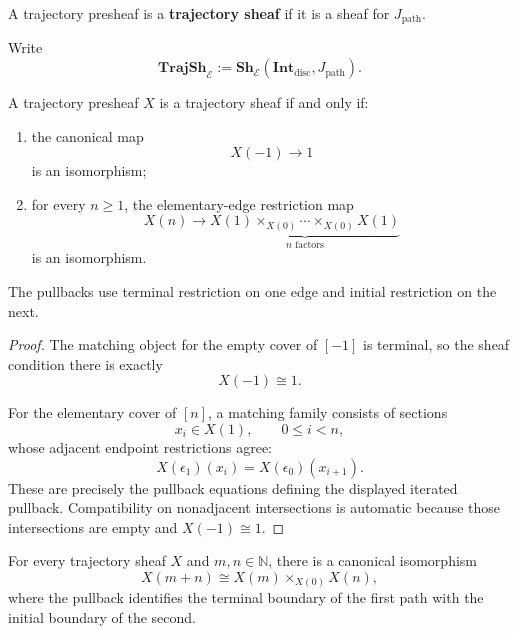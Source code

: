 \begin{definition}
\label{def:trajectory-sheaf}
A trajectory presheaf is a \textbf{trajectory sheaf} if it is a sheaf for
\(J_{\mathrm{path}}\).
\end{definition}

Write
\[
    \mathbf{TrajSh}_{\mathcal E}
    :=
    \mathbf{Sh}_{\mathcal E}
    \left(
        \mathbf{Int}_{\mathrm{disc}},
        J_{\mathrm{path}}
    \right).
\]

\begin{proposition}
\label{prop:concrete-trajectory-sheaf-condition}
A trajectory presheaf \(X\) is a trajectory sheaf if and only if:
\begin{enumerate}
    \item the canonical map
    \[
        X(-1)\to1
    \]
    is an isomorphism;
    \item for every \(n\geq1\), the elementary-edge restriction map
    \[
        X(n)
        \longrightarrow
        \underbrace{
        X(1)\times_{X(0)}
        \cdots\times_{X(0)}X(1)
        }_{n\text{ factors}}
    \]
    is an isomorphism.
\end{enumerate}
The pullbacks use terminal restriction on one edge and initial restriction
on the next.
\end{proposition}

\begin{proof}
The matching object for the empty cover of \([-1]\) is terminal, so the
sheaf condition there is exactly
\[
    X(-1)\cong1.
\]

For the elementary cover of \([n]\), a matching family consists of
sections
\[
    x_i\in X(1),
    \qquad
    0\leq i<n,
\]
whose adjacent endpoint restrictions agree:
\[
    X(\epsilon_1)(x_i)
    =
    X(\epsilon_0)(x_{i+1}).
\]
These are precisely the pullback equations defining the displayed iterated
pullback. Compatibility on nonadjacent intersections is automatic because
those intersections are empty and \(X(-1)\cong1\).
\end{proof}

\begin{corollary}
\label{cor:adjacent-temporal-gluing}
For every trajectory sheaf \(X\) and \(m,n\in\mathbb N\), there is a
canonical isomorphism
\[
    X(m+n)
    \cong
    X(m)\times_{X(0)}X(n),
\]
where the pullback identifies the terminal boundary of the first path with
the initial boundary of the second.
\end{corollary}

